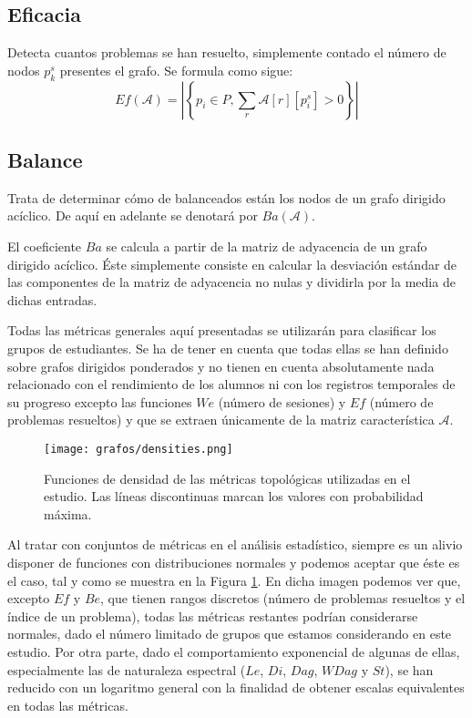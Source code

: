\subsection{Eficacia}
Detecta cuantos problemas se han resuelto, simplemente contado el número de nodos $p_k^s$ presentes el grafo. Se formula como sigue:
\begin{equation}
Ef(\mathcal{A}) = \left|\left\lbrace p_i \in P, \sum_r \mathcal{A}[r][p_i^s] > 0 \right\rbrace\right|
\end{equation}
\subsection{Balance}

Trata de determinar cómo de balanceados están los nodos de un grafo dirigido acíclico. De aquí en adelante se denotará por $Ba(\mathcal{A})$.

El coeficiente $Ba$ se calcula a partir de la matriz de adyacencia de un grafo dirigido acíclico. Éste simplemente consiste en calcular la desviación estándar de las componentes de la matriz de adyacencia no nulas y dividirla por la media de dichas entradas.

Todas las métricas generales aquí presentadas se utilizarán para clasificar los grupos de estudiantes. Se ha de tener en cuenta que todas ellas se han definido sobre grafos dirigidos ponderados y no tienen en cuenta absolutamente nada relacionado con el rendimiento de los alumnos ni con los registros temporales de su progreso excepto las funciones $We$ (número de sesiones) y $Ef$ (número de problemas resueltos) y que se extraen únicamente de la matriz característica $\mathcal{A}$.

\begin{figure}[H]
    \centering
    \texttt{[image: grafos/densities.png]}
    \caption{Funciones de densidad de las métricas topológicas utilizadas en el estudio. Las líneas discontinuas marcan los valores con probabilidad máxima.}
    \label{fig:densities}
\end{figure}

Al tratar con conjuntos de métricas en el análisis estadístico, siempre es un alivio disponer de funciones con distribuciones normales y podemos aceptar que éste es el caso, tal y como se muestra en la Figura \ref{fig:densities}. En dicha imagen podemos ver que, excepto $Ef$ y $Be$, que tienen rangos discretos (número de problemas resueltos y el índice de un problema), todas las métricas restantes podrían considerarse normales, dado el número limitado de grupos que estamos considerando en este estudio. Por otra parte, dado el comportamiento exponencial de algunas de ellas, especialmente las de naturaleza espectral ($Le$, $Di$, $Dag$, $WDag$ y $St$), se han reducido con un logaritmo general con la finalidad de obtener escalas equivalentes en todas las métricas.